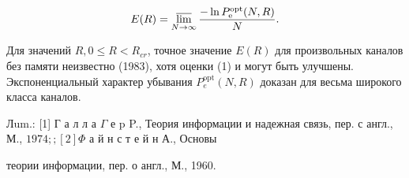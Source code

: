 \documentclass[10pt]{article}
\begin{document}
\[

E(R)=\varlimsup_{N \rightarrow \infty} \frac{-\ln P_{\mathrm{e}}^{\mathrm{opt}}(N, R)}{N} .

\]



Для значений $R, 0 \leqslant R<R_{c r}$, точное значение $E(R)$ для произвольных каналов без памяти неизвестно (1983), хотя оценки (1) и могут быть улучшены. Экспоненциальный характер убывания $P_{e}^{\mathrm{opt}}(N, R)$ доказан для весьма широкого класса каналов.



Лum.: [1] Г а л л а $\Gamma$ е p P., Теория информации и надежная связь, пер. с англ., М., $1974 ; ;[2] \Phi$ а й н с т е й н А., Основы



теории информации, пер. о англ., М., 1960.
\end{document}

